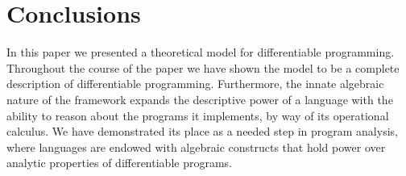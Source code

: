 \section{Conclusions}

In this paper we presented a theoretical model for differentiable programming. Throughout the course of the paper we have shown the model to be a complete description of differentiable programming.
Furthermore, the innate algebraic nature of the framework expands the descriptive power of a language with the ability to reason about the programs it implements, by way of its operational calculus. We have demonstrated its place as a needed step in program analysis, where languages are endowed with algebraic constructs that hold power over analytic properties of differentiable programs. 
